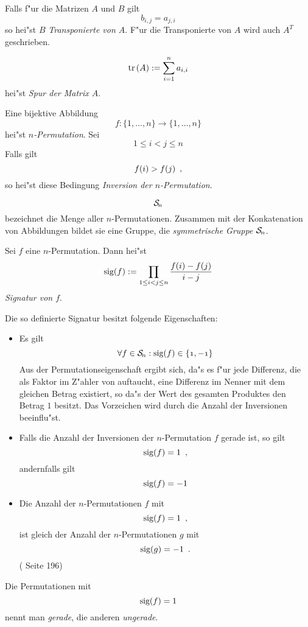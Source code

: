\MyBeginDef
{}
    Falls f"ur die Matrizen $A$ und $B$ gilt
    \[ b_{i,j} = a_{j,i} \] so hei"st $B$ { \em Transponierte von $A$}.
    F"ur die Transponierte von $A$ wird auch $A^T$ geschrieben.
\MyEndDef

\MyBeginDef
\label{DefTr}
    \[ \mbox{\rm tr} \,(A) := \sum_{i=1}^n a_{i,i} \]
    hei"st {\em Spur der Matrix $A$}.
\MyEndDef

\MyBeginDef
{}
    Eine bijektive Abbildung
    \[ f : \{1,\ldots,n \} \rightarrow \{1, \ldots, n \} \]
    hei"st {\em $n$-Permutation}.
    Sei \[ 1 \leq i < j \leq n \] Falls gilt
    \[ f(i) > f(j) \mbox{\hspace{0.5em},} \] so hei"st diese Bedingung {\em Inversion der
    $n$-Permutation}.
\MyEndDef

\[ \cal S \mit \!_n \] bezeichnet die Menge aller $n$-Permutationen. Zusammen mit
der Konkatenation von Abbildungen bildet sie eine Gruppe, die
{\em symmetrische Gruppe $\cal S \mit \!_n$}.

\MyBeginDef
{}
\label{DefSig}
    Sei $f$ eine $n$-Permutation. Dann hei"st
    \begin{equation}
    \label{EquDefSig}
        \mbox{\rm sig}(f) := \prod_{1 \leq i < j \leq n} \frac{f(i)-f(j)}{i - j}
    \end{equation}
    {\em Signatur von $f$}.
\MyEndDef

Die so definierte Signatur besitzt folgende Eigenschaften:
\begin{itemize}
\item 
      Es gilt
      \[ \forall f \in \cal S \mit \!_n: \mbox{\rm sig}(f) \in \{ 1,-1 \} \]
      Aus der Permutationseigenschaft ergibt sich, da"s es f"ur jede 
      Differenz, die als Faktor im Z"ahler von  auftaucht,
      eine Differenz im Nenner mit dem gleichen Betrag existiert, so da"s 
      der Wert des gesamten Produktes den Betrag $1$ besitzt. Das Vorzeichen
      wird durch die Anzahl der Inversionen beeinflu"st.
\item
      Falls die Anzahl der Inversionen der $n$-Permutation $f$ gerade ist,
      so gilt \[ \mbox{\rm sig}(f)= 1 \mbox{\hspace{0.5em},} \] andernfalls gilt
      \[ \mbox{\rm sig}(f) = -1 \]
\item

      Die Anzahl der $n$-Permutationen $f$ mit \[ \mbox{\rm sig}(f)=1 \mbox{\hspace{0.5em},} \]
      ist gleich
      der Anzahl der $n$-Permutationen $g$ mit \[ \mbox{\rm sig}(g)=-1 \mbox{\hspace{0.5em}.} \]
      (\cite{Doer77} Seite 196)
\end{itemize}

Die Permutationen mit \[ \mbox{\rm sig}(f)=1 \] nennt man {\em gerade}, die anderen 
{\em ungerade}.

